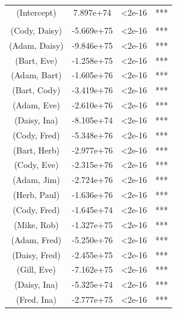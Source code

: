 \begin{table}[t]
\begin{tabular}{cccc}
%
(Intercept)            &  7.897e+74 &  <2e-16 & ***\\
\\
(Cody, Daisy)  &  	-5.669e+75  &  <2e-16 & ***\\
(Adam, Daisy)  &   -9.846e+75  &   <2e-16 &***\\
(Bart, Eve)  	&   -1.258e+75  &<2e-16 &***\\
(Adam, Bart)  	&   -1.605e+76  & <2e-16 &***\\
(Bart, Cody)  	&   -3.419e+76  & <2e-16 &***\\
(Adam, Eve)  	&   -2.610e+76  & <2e-16 &***\\
(Daisy, Ina)  	&  	-8.105e+74 	 &  <2e-16 &***\\
(Cody, Fred)  	&   -5.348e+76  &<2e-16 &***\\
(Bart, Herb)  	&   -2.977e+76  &<2e-16 &***\\
(Cody, Eve)  	&   -2.315e+76  & <2e-16 &***\\
(Adam, Jim)  	&   -2.724e+76    & <2e-16 &***\\
(Herb, Paul)  	&   -1.636e+76      &<2e-16 &***\\
(Cody, Fred)  	&   -1.645e+74     & <2e-16 &***\\
(Mike, Rob)  	&   -1.327e+75    & <2e-16 &***\\
(Adam, Fred)  	&   -5.250e+76     & <2e-16 &***\\
(Daisy, Fred)  &   -2.455e+75      &<2e-16 &***\\
(Gill, Eve)	  	&   -7.162e+75    & <2e-16 &***\\
(Daisy, Ina)  	&   -5.325e+74      &<2e-16 &***\\
(Fred, Ina)  	&   -2.777e+75     & <2e-16 &***\\

\end{tabular}
\end{table}
